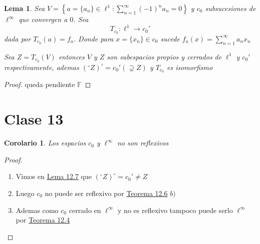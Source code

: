 \documentclass[10pt]{extarticle}
\theoremstyle{break}
\newtheorem{corollary}{Corolario}[theorem]
\newtheorem{lemma}[theorem]{Lema}
\theoremstyle{definition}
\begin{document}
\begin{lemma}\label{12.7}
	Sea $V=\left\{  a=\{ a_{n} \}\in \ell^{1} : \sum^{\infty}_{n=1}(-1)^{n}a_{n}=0 \right\}$ y $c_{0}$ subsucesiones de $\ell^{\infty}$ que convergen a $0$. Sea 
	$$T_{c_{0}}:\ell^{1}\rightarrow c_{0}'$$ dada por $T_{c_{0}}(a)=f_{a}$. 
	Donde para $x=\{ x_{n} \}\in c_{0}$ sucede $f_{a}(x)=\sum^{\infty}_{n=1}a_{n}x_{n}$

	Sea $Z=T_{c_{0}}(V)$ entonces $V$ y $Z$ son subespacios propios y cerrados de $\ell^{1}$ y $c_{0}'$ respectivamente, ademas $(^{\circ}Z)^{\circ}=c_{0}'(\supsetneq Z)$ y $T_{c_{0}}$ es isomorfismo
\end{lemma}
\begin{proof}
queda pendiente $\mathbb{F}$
\end{proof}

\section{Clase 13}

\begin{corollary}
	Los espacios $c_{0}$ y $\ell^{\infty}$ no son reflexivos
\end{corollary}
\begin{proof}
	\begin{enumerate}
		\item Vimos en \hyperref[12.7]{Lema 12.7}  que $ ( ^{\circ}Z  ) ^{\circ} =c_{0}'\neq Z $ 
		\item Luego $ c_{0} $ no puede ser reflexivo por \hyperref[12.6]{Teorema 12.6} $ b) $ 
		\item Ademas como $ c_{0} $ cerrado en $ \ell^{\infty}  $ y no es reflexivo tampoco puede serlo $ \ell^{\infty}  $ por \hyperref[12.4]{Teorema 12.4} 
	\end{enumerate}
\end{proof}
\end{document}
